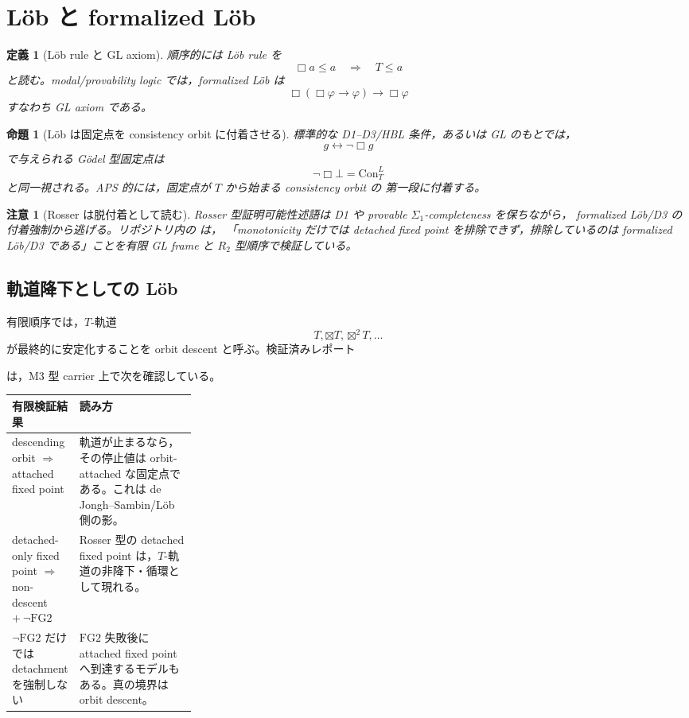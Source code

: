 ﻿\documentclass[a4paper,10pt]{ltjsarticle}
\newtheorem{proposition}[theorem]{命題}
\newtheorem{definition}[theorem]{定義}
\newtheorem{remark}[theorem]{注意}
\newcommand{\FGtwo}{\mathrm{FG2}}
\newcommand{\Con}{\mathrm{Con}}
\newcommand{\Boxop}{\Box}
\newcommand{\Btx}{\boxtimes}
\newcommand{\Top}{T}
\newcommand{\Bot}{\bot}
\begin{document}
\section{Löb と formalized Löb}

\begin{definition}[Löb rule と GL axiom]
順序的には Löb rule を
\[
\Boxop a\le a\quad\Longrightarrow\quad \Top\le a
\]
と読む。modal/provability logic では，formalized Löb は
\[
\Boxop(\Boxop\varphi\to\varphi)\to\Boxop\varphi
\]
すなわち GL axiom である。
\end{definition}

\begin{proposition}[Löb は固定点を consistency orbit に付着させる]
標準的な D1--D3/HBL 条件，あるいは GL のもとでは，
\[
g\leftrightarrow\neg\Boxop g
\]
で与えられる Gödel 型固定点は
\[
\neg\Boxop\Bot=\Con_T^L
\]
と同一視される。APS 的には，固定点が \(\Top\) から始まる consistency orbit の
第一段に付着する。
\end{proposition}

\begin{remark}[Rosser は脱付着として読む]
Rosser 型証明可能性述語は D1 や provable \(\Sigma_1\)-completeness を保ちながら，
formalized Löb/D3 の付着強制から逃げる。リポジトリ内の
 は，
「monotonicity だけでは detached fixed point を排除できず，排除しているのは
formalized Löb/D3 である」ことを有限 GL frame と \(R_2\) 型順序で検証している。
\end{remark}

\subsection{軌道降下としての Löb}

有限順序では，\(\Top\)-軌道
\[
\Top,\Btx\Top,\Btx^2\Top,\ldots
\]
が最終的に安定化することを orbit descent と呼ぶ。検証済みレポート
\begin{quote}\small
{}
\end{quote}
は，M3 型 carrier 上で次を確認している。

\begin{center}
\begin{tabularx}{\linewidth}{>{\raggedright\arraybackslash}p{0.27\linewidth}
>{\raggedright\arraybackslash}X}
\toprule
有限検証結果 & 読み方 \\
\midrule
descending orbit \(\Rightarrow\) attached fixed point &
軌道が止まるなら，その停止値は orbit-attached な固定点である。これは de Jongh--Sambin/Löb 側の影。\\
detached-only fixed point \(\Rightarrow\) non-descent \(+\ \neg\FGtwo\) &
Rosser 型の detached fixed point は，\(\Top\)-軌道の非降下・循環として現れる。\\
\(\neg\FGtwo\) だけでは detachment を強制しない &
\(\FGtwo\) 失敗後に attached fixed point へ到達するモデルもある。真の境界は orbit descent。\\
\bottomrule
\end{tabularx}
\end{center}
\end{document}
